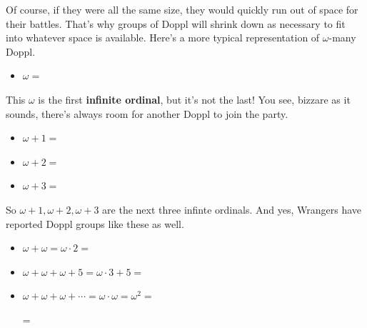 Of course, if they were all the same size, they would quickly run out
of space for their \mappMobimon{} battles. That's
why groups of Doppl will shrink down as necessary to fit into whatever space
is available. Here's a more typical representation of \(\omega\)-many Doppl.

\begin{itemize}
\item \(\omega=\) \mappDopplOmega
\end{itemize}

This \(\omega\) is the first \textbf{infinite ordinal}, but it's not the last!
You see, bizzare as it sounds, there's always room for another
Doppl to join the party.

\begin{itemize}
\item\(\omega+1=\) \mappDopplOmega\mappDoppl

\item\(\omega+2=\) \mappDopplOmega\mappDoppl\mappDoppl

\item\(\omega+3=\) \mappDopplOmega\mappDoppl\mappDoppl\mappDoppl
\end{itemize}

So \(\omega+1,\omega+2,\omega+3\) are the next three infinte ordinals.
And yes, Wrangers have reported Doppl groups like these as well.

\begin{itemize}
\item \(\omega+\omega=\omega\cdot2=\) \mappDopplOmega\mappDopplOmega

\item \(\omega+\omega+\omega+5=\omega\cdot 3 + 5=\) \mappDopplOmega\mappDopplOmega\mappDopplOmega\mappDoppl\mappDoppl\mappDoppl\mappDoppl\mappDoppl

\item \(\omega+\omega+\omega+\cdots=\omega\cdot\omega=\omega^2=\)
\mappDopplOmega\mappDopplOmega\mappDopplOmega\mappDopplOmega\mappDopplOmega
\mappDopplOmega\mappDopplOmega\mappDopplOmega\mappDopplOmega\mappDopplOmega
\mappDopplOmega\mappDopplOmega\mappDopplOmega\mappDopplOmega\mappDopplOmega
\mappDopplOmega\mappDopplOmega\mappDopplOmega\mappDopplOmega\mappDopplOmega
\mappDopplOmega\mappDopplOmega\mappDopplOmega\mappDopplOmega\mappDopplOmega
\mappDopplOmega\mappDopplOmega\mappDopplOmega\mappDopplOmega\mappDopplOmega
\mappDopplOmega\mappDopplOmega\mappDopplOmega\mappDopplOmega\mappDopplOmega
\mappDopplOmega\mappDopplOmega\mappDopplOmega\mappDopplOmega\mappDopplOmega

= \mappDopplOmegaSquared
\end{itemize}

